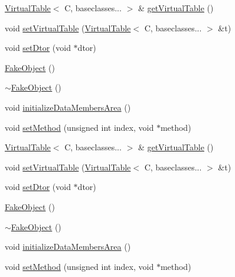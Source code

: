 \begin{DoxyCompactItemize}
\item 
\mbox{\hyperlink{structfakeit_1_1VirtualTable}{Virtual\+Table}}$<$ C, baseclasses... $>$ \& \mbox{\hyperlink{classfakeit_1_1FakeObject_a28a2c51a5eebcb098d63cc0e4afd2a35}{get\+Virtual\+Table}} ()
\item 
void \mbox{\hyperlink{classfakeit_1_1FakeObject_a541dcdf0dd88facbf2025790c41c1964}{set\+Virtual\+Table}} (\mbox{\hyperlink{structfakeit_1_1VirtualTable}{Virtual\+Table}}$<$ C, baseclasses... $>$ \&t)
\item 
void \mbox{\hyperlink{classfakeit_1_1FakeObject_a8045605042e0351da1e5d81288ae46ec}{set\+Dtor}} (void $\ast$dtor)
\item 
\mbox{\hyperlink{classfakeit_1_1FakeObject_ad705c5388b4354d1fdeef0bdd0151167}{Fake\+Object}} ()
\item 
\mbox{\hyperlink{classfakeit_1_1FakeObject_abfc9604c62598655fdefcc98a329dbbf}{$\sim$\+Fake\+Object}} ()
\item 
void \mbox{\hyperlink{classfakeit_1_1FakeObject_a894a7e1ef1e41cec0eb91cbb3d5c73cd}{initialize\+Data\+Members\+Area}} ()
\item 
void \mbox{\hyperlink{classfakeit_1_1FakeObject_ad05ea03dec6dc302d6d7b62e47bd1219}{set\+Method}} (unsigned int index, void $\ast$method)
\item 
\mbox{\hyperlink{structfakeit_1_1VirtualTable}{Virtual\+Table}}$<$ C, baseclasses... $>$ \& \mbox{\hyperlink{classfakeit_1_1FakeObject_a28a2c51a5eebcb098d63cc0e4afd2a35}{get\+Virtual\+Table}} ()
\item 
void \mbox{\hyperlink{classfakeit_1_1FakeObject_a541dcdf0dd88facbf2025790c41c1964}{set\+Virtual\+Table}} (\mbox{\hyperlink{structfakeit_1_1VirtualTable}{Virtual\+Table}}$<$ C, baseclasses... $>$ \&t)
\item 
void \mbox{\hyperlink{classfakeit_1_1FakeObject_a8045605042e0351da1e5d81288ae46ec}{set\+Dtor}} (void $\ast$dtor)
\item 
\mbox{\hyperlink{classfakeit_1_1FakeObject_ad705c5388b4354d1fdeef0bdd0151167}{Fake\+Object}} ()
\item 
\mbox{\hyperlink{classfakeit_1_1FakeObject_abfc9604c62598655fdefcc98a329dbbf}{$\sim$\+Fake\+Object}} ()
\item 
void \mbox{\hyperlink{classfakeit_1_1FakeObject_a894a7e1ef1e41cec0eb91cbb3d5c73cd}{initialize\+Data\+Members\+Area}} ()
\item 
void \mbox{\hyperlink{classfakeit_1_1FakeObject_ad05ea03dec6dc302d6d7b62e47bd1219}{set\+Method}} (unsigned int index, void $\ast$method)
\item 

\end{DoxyCompactItemize}
